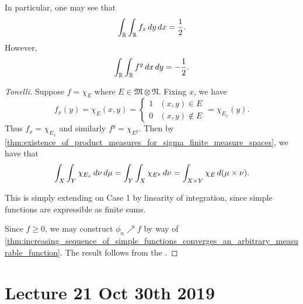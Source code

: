 \documentclass[notoc,notitlepage]{tufte-book}
\begin{document}
\begin{eg}
  In particular, one may see that
  \begin{equation*}
    \int_{\mathbb{R}} \int_{\mathbb{R}} f_x \mathop{}\!d{y} \mathop{}\!d{x} = \frac{1}{2}.
  \end{equation*}
  However,
  \begin{equation*}
    \int_{\mathbb{R}} \int_{\mathbb{R}} f^y \mathop{}\!d{x} \mathop{}\!d{y} = - \frac{1}{2}.
  \end{equation*}
\end{eg}

\begin{proof}[Tonelli]
  Suppose $f = \chi_E$ where $E \in \mathfrak{M} \otimes \mathfrak{N}$.
  Fixing $x$, we have
  \begin{equation*}
    f_x(y) = \chi_E (x, y) = \begin{cases}
      1 & (x, y) \in E \\
      0 & (x, y) \notin E
    \end{cases}
    = \chi_{E_x}(y).
  \end{equation*}
  Thus $f_x = \chi_{E_x}$ and similarly $f^y = \chi_{E^y}$.
  Then by
  \cref{thm:existence_of_product_measures_for_sigma_finite_measure_spaces},
  we have that
  \begin{equation*}
    \int_X \int_Y \chi_{E_x} \mathop{}\!d{\nu} \mathop{}\!d{\mu}
    = \int_Y \int_X \chi_{E^y} \mathop{}\!d{\nu}
    = \int_{X \times Y} \chi_E \mathop{}\!d{(\mu \times \nu)}.
  \end{equation*}

  \noindent
  This is simply extending on Case 1 by linearity of integration,
  since simple functions are expressible as finite sums.

  \noindent
  Since $f \geq 0$, we may construct $\phi_n \nearrow f$ by way of
  \cref{thm:increasing_sequence_of_simple_functions_converges_an_arbitrary_measurable_function}.
  The result follows from the .
\end{proof}



\chapter{Lecture 21 Oct 30th 2019}%
\label{chp:lecture_21_oct_30th_2019}
\end{document}
